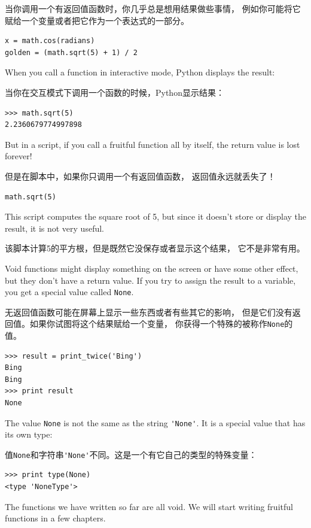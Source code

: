 \documentclass[10pt]{book}
\begin{document}
\begin{CJK}{UTF8}{gbsn}
当你调用一个有返回值函数时，你几乎总是想用结果做些事情，
例如你可能将它赋给一个变量或者把它作为一个表达式的一部分。

\begin{verbatim}
x = math.cos(radians)
golden = (math.sqrt(5) + 1) / 2
\end{verbatim}
%
When you call a function in interactive mode, Python displays
the result:

当你在交互模式下调用一个函数的时候，Python显示结果：

\begin{verbatim}
>>> math.sqrt(5)
2.2360679774997898
\end{verbatim}
%
But in a script, if you call a fruitful function all by itself,
the return value is lost forever!

但是在脚本中，如果你只调用一个有返回值函数，
返回值永远就丢失了！

\begin{verbatim}
math.sqrt(5)
\end{verbatim}
%
This script computes the square root of 5, but since it doesn't store
or display the result, it is not very useful.

该脚本计算5的平方根，但是既然它没保存或者显示这个结果，
它不是非常有用。

Void functions might display something on the screen or have some
other effect, but they don't have a return value.  If you try to
assign the result to a variable, you get a special value called
{\tt None}.

无返回值函数可能在屏幕上显示一些东西或者有些其它的影响，
但是它们没有返回值。如果你试图将这个结果赋给一个变量，
你获得一个特殊的被称作{\tt None}的值。

\begin{verbatim}
>>> result = print_twice('Bing')
Bing
Bing
>>> print result
None
\end{verbatim}
%
The value {\tt None} is not the same as the string \verb"'None'". 
It is a special value that has its own type:

值{\tt None}和字符串\verb"'None'"不同。这是一个有它自己的类型的特殊变量：

\begin{verbatim}
>>> print type(None)
<type 'NoneType'>
\end{verbatim}
%
The functions we have written so far are all void.  We will start
writing fruitful functions in a few chapters.


\end{CJK}
\end{document}
